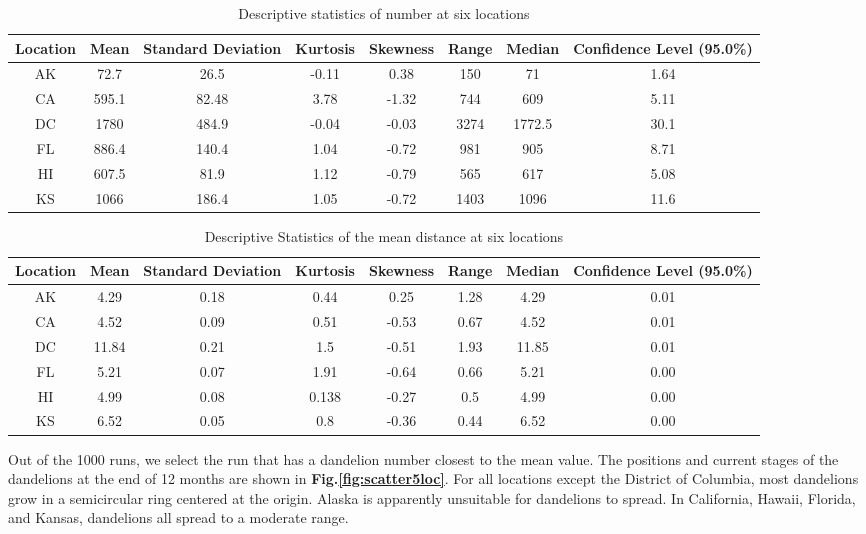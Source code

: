 \documentclass[12pt]{article}
\begin{document}
			{
				\fontsize{10}{14}\selectfont
				{
					\begin{longtable}{cccccccc}
						\caption{Descriptive statistics of number at six locations}
						\label{tb:numDistribution}\\
						\toprule
						Location&Mean&Standard Deviation&Kurtosis&Skewness&Range&Median&Confidence Level (95.0\%)\\
						\toprule
						AK&72.7&26.5&-0.11&0.38&150&71&1.64\\
						CA&595.1&82.48&3.78&-1.32&744&609&5.11\\
						DC&1780&484.9&-0.04&-0.03&3274&1772.5&30.1\\
						FL&886.4&140.4&1.04&-0.72&981&905&8.71\\
						HI&607.5&81.9&1.12&-0.79&565&617&5.08\\
						KS&1066&186.4&1.05&-0.72&1403&1096&11.6\\
						\bottomrule
					\end{longtable}
					
				}
			}
			
			{
				\fontsize{10}{14}\selectfont
				{
					\begin{longtable}{cccccccc}
						\caption{Descriptive Statistics of the mean distance at six locations}
						\label{tb:distDistribution}\\
						\toprule
						Location&Mean&Standard Deviation&Kurtosis&Skewness&Range&Median&Confidence Level (95.0\%)\\
						\toprule
						AK&4.29&0.18&0.44&0.25&1.28&4.29&0.01\\
						CA&4.52&0.09&0.51&-0.53&0.67&4.52&0.01\\
						DC&11.84&0.21&1.5&-0.51&1.93&11.85&0.01\\
						FL&5.21&0.07&1.91&-0.64&0.66&5.21&0.00\\
						HI&4.99&0.08&0.138&-0.27&0.5&4.99&0.00\\
						KS&6.52&0.05&0.8&-0.36&0.44&6.52&0.00\\
						\bottomrule
					\end{longtable}
				}
			}
			
			Out of the 1000 runs, we select the run that has a dandelion number closest to the mean value.  The positions and current stages of the dandelions at the end of 12 months are shown in \textbf{Fig.\ref{fig:scatter5loc}}.  For all locations except the District of Columbia, most dandelions grow in a semicircular ring centered at the origin.  Alaska is apparently unsuitable for dandelions to spread.  In California, Hawaii, Florida, and Kansas, dandelions all spread to a moderate range.
			
\end{document}
